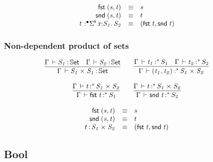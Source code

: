 \documentclass[11pt]{article}
\theoremstyle{plain}
\begin{document}

\[
\begin{array}{rcll}
\mathit{\mathsf{fst}_{} \: \mathit{(s,t)_{}}} & \equiv & s \\
\mathit{\mathsf{snd}_{} \: \mathit{(s,t)_{}}} & \equiv & t \\
\mathit{t} \,^{\,}{:}^{\bullet} \mathit{\textnormal{$\Sigma$}^{\mathsf{s}}\,x \mathit{:} S_1.\,\mathit{S_2}} & \equiv & \mathit{(\mathit{\mathsf{fst}_{} \: t},\mathit{\mathsf{snd}_{} \: t})_{}}
\end{array}
\]

\subsubsection{Non-dependent product of sets}


\[
\begin{array}{c}
\infer{\ofdtp{\Gamma}{\prd{S_1}{S_1}}{\types}}
      {\ofdtp{\Gamma}{S_1}{\types} &
        \ofdtp{\Gamma}{S_2}{\types}}
\qquad
\infer{\oftpe{\Gamma}{\pair{t_1}{t_2}}{\vcond}{\prd {S_1} {S_2}}}
      { \oftpe{\Gamma}{t_1}{\vcond}{S_1} &
        \oftpe{\Gamma}{t_2}{\vcond}{S_2}}
\\ \\
\infer{\oftpe{\Gamma}{\fst t}{\vcond}{{S_1}}}
      {\oftpe{\Gamma}{t}{\vcond}{\prd{S_1}{S_2}}}
\qquad
\infer{\oftpe{\Gamma}{\snd t}{\vcond}{{S_2}}}
      {\oftpe{\Gamma}{t}{\vcond}{\prd{S_1}{S_2}}}
\end{array}
\]

\[
\begin{array}{rcll}
\mathit{\mathsf{fst}_{} \: \mathit{(s,t)_{}}} & \equiv & s \\
\mathit{\mathsf{snd}_{} \: \mathit{(s,t)_{}}} & \equiv & t \\
t \, \mathit{:} \, \mathit{S_1} \times_{\mathit{}} \mathit{S_2} & \equiv & \mathit{(\mathit{\mathsf{fst}_{} \: t},\mathit{\mathsf{snd}_{} \: t})_{}}
\end{array}
\]

\subsection{Bool}
\end{document}
